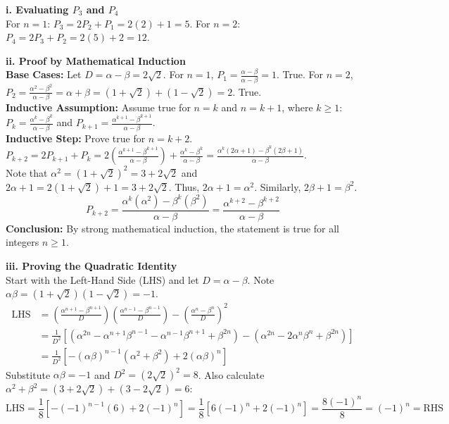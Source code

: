 \begin{solution}
\textbf{i. Evaluating $P_3$ and $P_4$}\\
For $n=1$: $P_3 = 2P_2 + P_1 = 2(2) + 1 = 5$. For $n=2$: $P_4 = 2P_3 + P_2 = 2(5) + 2 = 12$.

\textbf{ii. Proof by Mathematical Induction}\\
\textbf{Base Cases:} Let $D = \alpha - \beta = 2\sqrt{2}$. For $n=1$, $P_1 = \frac{\alpha - \beta}{\alpha - \beta} = 1$. True. For $n=2$, $P_2 = \frac{\alpha^2 - \beta^2}{\alpha - \beta} = \alpha + \beta = (1+\sqrt{2}) + (1-\sqrt{2}) = 2$. True.\\
\textbf{Inductive Assumption:} Assume true for $n=k$ and $n=k+1$, where $k \ge 1$: $P_k = \frac{\alpha^k - \beta^k}{\alpha - \beta}$ and $P_{k+1} = \frac{\alpha^{k+1} - \beta^{k+1}}{\alpha - \beta}$.\\
\textbf{Inductive Step:} Prove true for $n=k+2$. $P_{k+2} = 2P_{k+1} + P_k = 2\left(\frac{\alpha^{k+1} - \beta^{k+1}}{\alpha - \beta}\right) + \frac{\alpha^k - \beta^k}{\alpha - \beta} = \frac{\alpha^k(2\alpha + 1) - \beta^k(2\beta + 1)}{\alpha - \beta}$.\\
Note that $\alpha^2 = (1+\sqrt{2})^2 = 3+2\sqrt{2}$ and $2\alpha + 1 = 2(1+\sqrt{2}) + 1 = 3+2\sqrt{2}$. Thus, $2\alpha + 1 = \alpha^2$. Similarly, $2\beta + 1 = \beta^2$.
\[
P_{k+2} = \frac{\alpha^k(\alpha^2) - \beta^k(\beta^2)}{\alpha - \beta} = \frac{\alpha^{k+2} - \beta^{k+2}}{\alpha - \beta}
\]
\textbf{Conclusion:} By strong mathematical induction, the statement is true for all integers $n \ge 1$.

\textbf{iii. Proving the Quadratic Identity}\\
Start with the Left-Hand Side (LHS) and let $D = \alpha - \beta$. Note $\alpha\beta = (1+\sqrt{2})(1-\sqrt{2}) = -1$.
\begin{align*}
\text{LHS} &= \left(\frac{\alpha^{n+1} - \beta^{n+1}}{D}\right)\left(\frac{\alpha^{n-1} - \beta^{n-1}}{D}\right) - \left(\frac{\alpha^n - \beta^n}{D}\right)^2\\
&= \frac{1}{D^2} [(\alpha^{2n} - \alpha^{n+1}\beta^{n-1} - \alpha^{n-1}\beta^{n+1} + \beta^{2n}) - (\alpha^{2n} - 2\alpha^n\beta^n + \beta^{2n})]\\
&= \frac{1}{D^2} [- (\alpha\beta)^{n-1}(\alpha^2 + \beta^2) + 2(\alpha\beta)^n]
\end{align*}
Substitute $\alpha\beta = -1$ and $D^2 = (2\sqrt{2})^2 = 8$. Also calculate $\alpha^2 + \beta^2 = (3+2\sqrt{2}) + (3-2\sqrt{2}) = 6$:
\[
\text{LHS} = \frac{1}{8} [- (-1)^{n-1}(6) + 2(-1)^n] = \frac{1}{8} [6(-1)^n + 2(-1)^n] = \frac{8(-1)^n}{8} = (-1)^n = \text{RHS}
\]


\end{solution}
